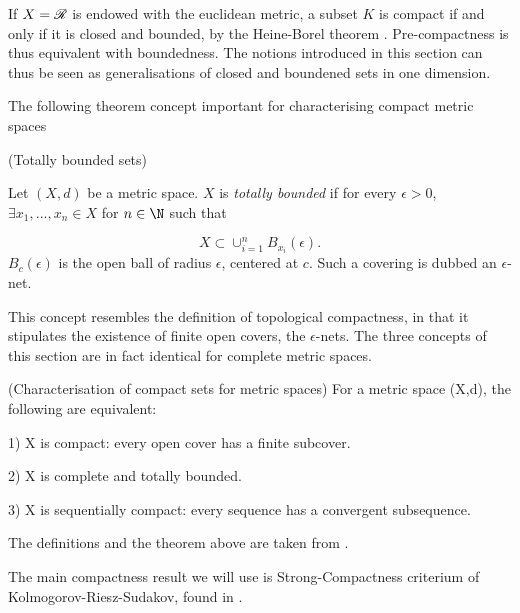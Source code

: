 \begin{definition}
\begin{definition}
\begin{remark}
 	If $X = \mathscr{R}$ is endowed with the euclidean metric, a subset $K$ is compact if and only if it is closed and bounded, by the Heine-Borel theorem \cite{kumaresan2005topology}. Pre-compactness is thus equivalent with boundedness. %
 	The notions introduced in this section can thus be seen as generalisations of closed and boundened sets in one dimension.  
\end{remark}

The following theorem concept important for characterising compact metric spaces

\begin{definition} (Totally bounded sets)
	
	Let $(X,d)$ be a metric space. $X$ is \emph{totally bounded} if for every $\epsilon > 0$, $\exists x_1, ..., x_n \in X$ for $n \in \N$ such that 
	
	\begin{equation}
		X \subset \cup_{i = 1}^n B_{x_i}(\epsilon).
	\end{equation} 
	$B_{c}(\epsilon)$ is the open ball of radius $\epsilon$, centered at $c$. Such a covering is dubbed an $\epsilon$-net.
\end{definition}

This concept resembles the definition of topological compactness, in that it stipulates the existence of  finite open covers, the $\epsilon$-nets. The three concepts of this section are in fact identical for complete metric spaces.

\begin{theorem} (Characterisation of compact sets for metric spaces) \label{thm:metric_space_equivalence}
	For a metric space (X,d), the following are equivalent: 
	
	1) X is compact: every open cover has a finite subcover. 
	
	2) X is complete and totally bounded. 
	
	3) X is sequentially compact: every sequence has a convergent subsequence.	
	
\end{theorem}

The definitions and the theorem above are taken from \cite{kumaresan2005topology}. 

The main compactness result we will use is Strong-Compactness criterium of Kolmogorov-Riesz-Sudakov, found in \citet{HANCHEOLSEN201984}.  


\end{definition}
\end{definition}
